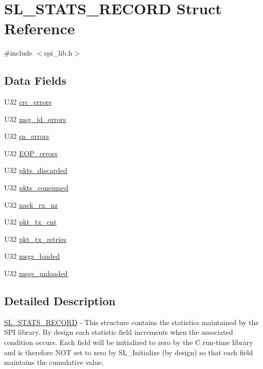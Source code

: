 \hypertarget{structSL__STATS__RECORD}{}\section{S\+L\+\_\+\+S\+T\+A\+T\+S\+\_\+\+R\+E\+C\+O\+RD Struct Reference}
\label{structSL__STATS__RECORD}


{\ttfamily \#include $<$spi\+\_\+lib.\+h$>$}

\subsection*{Data Fields}
\begin{DoxyCompactItemize}
\item 
U32 \mbox{\hyperlink{structSL__STATS__RECORD_ab5b0f72f7f1214260c7ea69875ab8c8e}{crc\+\_\+errors}}
\item 
U32 \mbox{\hyperlink{structSL__STATS__RECORD_a8e927b2659be74646c72ea3a86e8f0a6}{msg\+\_\+id\+\_\+errors}}
\item 
U32 \mbox{\hyperlink{structSL__STATS__RECORD_a3cbb616dbd6a162a89aead77f01f6d1c}{sn\+\_\+errors}}
\item 
U32 \mbox{\hyperlink{structSL__STATS__RECORD_aba81768cf5da8670ad6e2a6999b20a9a}{E\+O\+P\+\_\+errors}}
\item 
U32 \mbox{\hyperlink{structSL__STATS__RECORD_a01aa3907d25aac6de4578d06c774ce0b}{pkts\+\_\+discarded}}
\item 
U32 \mbox{\hyperlink{structSL__STATS__RECORD_a2d42749386f47b2fb31689fcf9935b71}{pkts\+\_\+consumed}}
\item 
U32 \mbox{\hyperlink{structSL__STATS__RECORD_a35ab3731fa491795516105f48065f1e2}{nack\+\_\+rx\+\_\+nz}}
\item 
U32 \mbox{\hyperlink{structSL__STATS__RECORD_a055b16b1180d49272cf2f0a141da8e43}{pkt\+\_\+tx\+\_\+cnt}}
\item 
U32 \mbox{\hyperlink{structSL__STATS__RECORD_a1c91dbfd47be872f128552b9888c8657}{pkt\+\_\+tx\+\_\+retries}}
\item 
U32 \mbox{\hyperlink{structSL__STATS__RECORD_af8d0d711604fee9933e701e10b6ecd63}{msgs\+\_\+loaded}}
\item 
U32 \mbox{\hyperlink{structSL__STATS__RECORD_a3cd797dbd975c8d5ed87d0faaa68da59}{msgs\+\_\+unloaded}}
\end{DoxyCompactItemize}


\subsection{Detailed Description}
\mbox{\hyperlink{structSL__STATS__RECORD}{S\+L\+\_\+\+S\+T\+A\+T\+S\+\_\+\+R\+E\+C\+O\+RD}} -\/ This structure contains the statistics maintained by the S\+PI library. By design each statistic field increments when the associated condition occurs. Each field will be initialized to zero by the C run-\/time library and is therefore N\+OT set to zero by S\+L\+\_\+\+Initialize (by design) so that each field maintains the cumulative value. 

